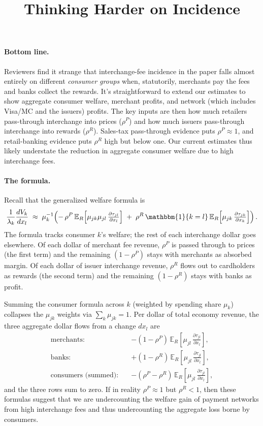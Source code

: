 \documentclass[11pt]{article}
\title{Thinking Harder on Incidence}
\author{}
\date{}
\begin{document}
\maketitle
\vspace{-3em}

\paragraph{Bottom line.}
Reviewers find it strange that interchange-fee incidence in the paper falls almost entirely on different \emph{consumer groups} when, statutorily, merchants pay the fees and banks collect the rewards.
It's straightforward to extend our estimates to show aggregate consumer welfare, merchant profits, and network (which includes Visa/MC and the issuers) profits.
The key inputs are then how much retailers pass-through interchange into prices ($\rho^P$) and how much issuers pass-through interchange into rewards ($\rho^R$).
Sales-tax pass-through evidence puts $\rho^P \approx 1$, and retail-banking evidence puts $\rho^R$ high but below one.
Our current estimates thus likely understate the reduction in aggregate consumer welfare due to high interchange fees.

\paragraph{The formula.}
Recall that the generalized welfare formula is
\[
  \frac{1}{\lambda_k}\frac{dV_k}{dx_l}
  \;\approx\;
  \mu_k^{-1}\!\left(
    -\,\rho^{P}\,\mathbb{E}_R\!\left[\mu_{jk}\mu_{jl}\,\tfrac{\partial \tau_{jl}}{\partial x_l}\right]
    \;+\;
    \rho^{R}\,\mathbbm{1}\{k=l\}\,\mathbb{E}_R\!\left[\mu_{jk}\,\tfrac{\partial \tau_{jk}}{\partial x_k}\right]
  \right).
\]
The formula tracks consumer $k$'s welfare; the rest of each interchange dollar goes elsewhere.
Of each dollar of merchant fee revenue, $\rho^P$ is passed through to prices (the first term) and the remaining $(1-\rho^P)$ stays with merchants as absorbed margin.
Of each dollar of issuer interchange revenue, $\rho^R$ flows out to cardholders as rewards (the second term) and the remaining $(1-\rho^R)$ stays with banks as profit.

Summing the consumer formula across $k$ (weighted by spending share $\mu_k$) collapses the $\mu_{jk}$ weights via $\sum_k \mu_{jk} = 1$.
Per dollar of total economy revenue, the three aggregate dollar flows from a change $dx_l$ are
\[
\begin{aligned}
\text{merchants:} \quad & -(1-\rho^P)\,\mathbb{E}_R\!\left[\mu_{jl}\,\tfrac{\partial \tau_{jl}}{\partial x_l}\right], \\
\text{banks:} \quad & +(1-\rho^R)\,\mathbb{E}_R\!\left[\mu_{jl}\,\tfrac{\partial \tau_{jl}}{\partial x_l}\right], \\
\text{consumers (summed):} \quad & -(\rho^P-\rho^R)\,\mathbb{E}_R\!\left[\mu_{jl}\,\tfrac{\partial \tau_{jl}}{\partial x_l}\right],
\end{aligned}
\]
and the three rows sum to zero.
If in reality $\rho^P\approx 1$ but $\rho^R < 1$, then these formulas suggest that we are undercounting the welfare gain of payment networks from high interchange fees and thus undercounting the aggregate loss borne by consumers.
\end{document}
